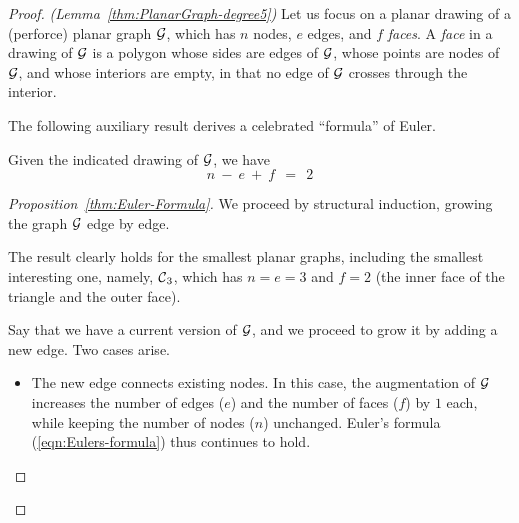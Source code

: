 \begin{proof} {\em (Lemma~\ref{thm:PlanarGraph-degree5})}
Let us focus on a planar drawing of a (perforce) planar graph $\mbox{$\cal G$}$,
which has $n$ nodes, $e$ edges, and $f$ {\it faces}.  A {\it face}
in a drawing of $\mbox{$\cal G$}$ is a polygon whose sides are edges of
$\mbox{$\cal G$}$, whose points are nodes of $\mbox{$\cal G$}$, and whose interiors are empty,
in that no edge of $\mbox{$\cal G$}$ crosses through the interior.
\bigskip

\noindent {}
\bigskip

The following auxiliary result derives a celebrated ``formula'' of
Euler.   

\begin{prop} 
\label{thm:Euler-Formula}
Given the indicated drawing of $\mbox{$\cal G$}$, we have
\begin{equation}
\label{eqn:Eulers-formula}
n \ - \ e \ + \ f \ \ = \ \ 2
\end{equation}
\end{prop}

\begin{proof} [Proposition~\ref{thm:Euler-Formula}]
We proceed by structural induction, growing the graph $\mbox{$\cal G$}$ edge by
edge.

The result clearly holds for the smallest planar graphs, including the
smallest interesting one, namely, $\mbox{$\cal C$}_3$, which has $n = e = 3$ and $f
=2$ (the inner face of the triangle and the outer face).

Say that we have a current version of $\mbox{$\cal G$}$, and we proceed to grow it
by adding a new edge.  Two cases arise.\begin{itemize}
\item
The new edge connects existing nodes.  In this case, the augmentation
of $\mbox{$\cal G$}$ increases the number of edges ($e$) and the number of faces
($f$) by $1$ each, while keeping the number of nodes ($n$) unchanged.
Euler's formula (\ref{eqn:Eulers-formula}) thus continues to hold.


\end{itemize}
\end{proof}
\end{proof}
